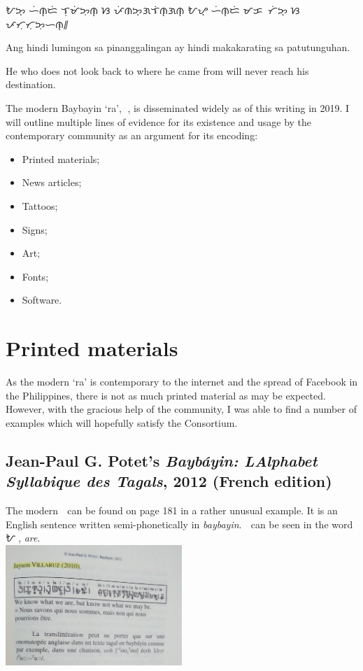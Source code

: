 \documentclass[a4paper,pagesize,openany,14pt,parskip=never]{scrbook}
\newcommand{\≈}{$\approx$}
\begin{document}
    {\baybayin ᜀᜅ᜔ ᜑᜒᜈ᜔ᜇᜒ ᜎᜓᜋᜒᜅᜓᜈ᜔ ᜐ ᜉᜒᜈᜅ᜔ᜄᜎᜒᜈ᜔ᜄᜈ᜔ ᜀᜌ᜔ ᜑᜒᜈ᜔ᜇᜒ ᜋᜃᜍᜍᜆᜒᜅ᜔ ᜐ ᜉᜆᜓᜆᜓᜅᜓᜑᜈ᜔᜶}

    Ang hindi lumingon sa pinanggalingan ay hindi makakarating sa patutunguhan.

    He who does not look back to where he came from will never reach his destination.

\newpage
{}
The modern Baybayin `ra', {\baybayin ᜍ}, is disseminated widely as of this writing in 2019. I will outline multiple lines of evidence for its existence and usage by the contemporary community as an argument for its encoding:

\begin{itemize}
    \item Printed materials;
    \item News articles;
    \item Tattoos;
    \item Signs;
    \item Art;
    \item Fonts;
    \item Software.
\end{itemize}

\section{Printed materials}

As the modern `ra' is contemporary to the internet and the spread of Facebook in the Philippines, there is not as much printed material as may be expected. However, with the gracious help of the community, I was able to find a number of examples which will hopefully satisfy the Consortium.

\subsection{Jean-Paul G. Potet's {\em Bayb\'ayin: L\textquotesingle Alphabet Syllabique des Tagals}, 2012 (French edition)}

The modern {\baybayin ᜍ} can be found on page {181} in a rather unusual example. It is an English sentence written semi-phonetically in {\em baybayin}. {\baybayin ᜍ} can be seen in the word {\baybayin ᜀᜍᜒ}, {\em are}.
 \\
\includegraphics[width=0.5\textwidth]{Potet2}
\end{document}
